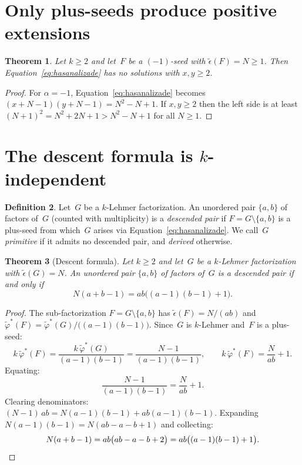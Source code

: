 \documentclass[11pt]{article}
\newtheorem{theorem}{Theorem}
\theoremstyle{definition}
\newtheorem{definition}[theorem]{Definition}
\theoremstyle{remark}
\newcommand{\eps}{\tilde{\epsilon}}
\newcommand{\phist}{\tilde{\varphi}^*}
\begin{document}
\section{Only plus-seeds produce positive extensions}

\begin{theorem}\label{thm:positive-only}
Let $k \ge 2$ and let~$F$ be a $(-1)$-seed with $\eps(F) = N \ge 1$.  Then
Equation~\eqref{eq:hasanalizade} has no solutions with $x, y \ge 2$.
\end{theorem}

\begin{proof}
For $\alpha = -1$, Equation~\eqref{eq:hasanalizade} becomes
$(x + N - 1)(y + N - 1) = N^2 - N + 1$.  If $x, y \ge 2$ then the left
side is at least $(N+1)^2 = N^2 + 2N + 1 > N^2 - N + 1$ for all
$N \ge 1$.
\end{proof}


\section{The descent formula is $k$-independent}

\begin{definition}\label{def:descent}
Let~$G$ be a $k$-Lehmer factorization.  An unordered pair $\{a, b\}$ of
factors of~$G$ (counted with multiplicity) is a \emph{descended pair} if
$F = G \setminus \{a, b\}$ is a plus-seed from which~$G$ arises via
Equation~\eqref{eq:hasanalizade}.  We call~$G$ \emph{primitive} if
it admits no descended pair, and \emph{derived} otherwise.
\end{definition}

\begin{theorem}[Descent formula]\label{thm:descent-formula}
Let $k \ge 2$ and let~$G$ be a $k$-Lehmer factorization with
$\eps(G) = N$.  An unordered pair $\{a, b\}$ of factors of~$G$ is a
descended pair if and only if
\begin{equation}\label{eq:descent}
  N(a + b - 1) = ab\bigl((a-1)(b-1) + 1\bigr).
\end{equation}
\end{theorem}

\begin{proof}
The sub-factorization $F = G \setminus \{a, b\}$ has
$\eps(F) = N/(ab)$ and $\phist(F) = \phist(G)/\bigl((a-1)(b-1)\bigr)$.
Since~$G$ is $k$-Lehmer and~$F$ is a plus-seed:
\[
  k\,\phist(F) = \frac{k\,\phist(G)}{(a-1)(b-1)} = \frac{N-1}{(a-1)(b-1)},
  \qquad
  k\,\phist(F) = \frac{N}{ab} + 1.
\]
Equating:
\begin{equation}\label{eq:k-cancels}
  \frac{N - 1}{(a-1)(b-1)} = \frac{N}{ab} + 1.
\end{equation}
Clearing denominators: $(N-1)\,ab = N(a-1)(b-1) + ab(a-1)(b-1)$.
Expanding $N(a-1)(b-1) = N(ab - a - b + 1)$ and collecting:
\[
  N(a + b - 1) = ab\bigl(ab - a - b + 2\bigr) = ab\bigl((a-1)(b-1)+1\bigr).
  \qedhere
\]
\end{proof}
\end{document}

